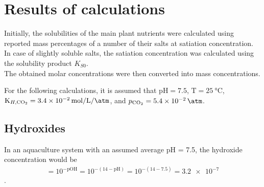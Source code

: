 \documentclass{scrartcl}
\begin{document}
\section{Results of calculations}
Initially, the solubilities of the main plant nutrients were calculated using reported mass percentages of a number of their salts at satiation concentration. In case of slightly soluble salts, the satiation concentration was calculated using the solubility product $K_{S0}$.\\
%
	\label{tab:solubilityResults}
%
%
%
%
%
The obtained molar concentrations were then converted into mass concentrations.\\
%
%
%
%
	\label{tab:solubilityResults}
%
%




For the following calculations, it is assumed that $\text{pH} = 7.5$, $\text{T} = \SI{25}{\degreeCelsius}$, $\text{K}_{H, \ce{CO2}} = \SI{3.4e-2}{\mol\per\liter\per\atm}$, and $p_{\ce{CO2}} = \SI{5.4e-2}{\atm}$.
%
%
%
\subsection{Hydroxides}
In an aquaculture system with an assumed average pH = 7.5, the hydroxide concentration would be
%
\begin{align}
	[\ce{OH-}] = 10^{-\text{pOH}} = 10^{-(14-\text{pH})} = 10^{-(14-7.5)} = \num{3.2e-7}
\end{align}
.
%
%
%
\end{document}
